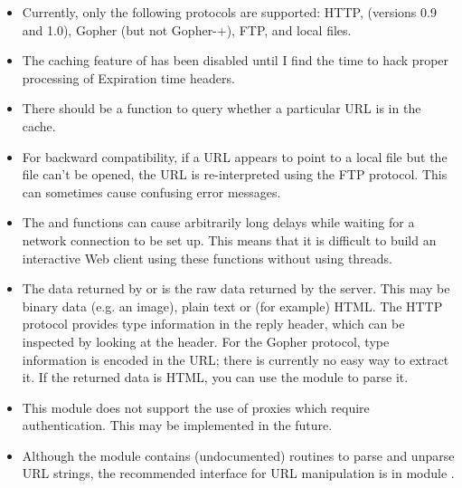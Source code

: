 \begin{itemize}

\item
Currently, only the following protocols are supported: HTTP, (versions
0.9 and 1.0), Gopher (but not Gopher-+), FTP, and local files.

\item
The caching feature of  has been disabled
until I find the time to hack proper processing of Expiration time
headers.

\item
There should be a function to query whether a particular URL is in
the cache.

\item
For backward compatibility, if a URL appears to point to a local file
but the file can't be opened, the URL is re-interpreted using the FTP
protocol.  This can sometimes cause confusing error messages.

\item
The  and  functions can
cause arbitrarily long delays while waiting for a network connection
to be set up.  This means that it is difficult to build an interactive
Web client using these functions without using threads.

\item
The data returned by  or 
is the raw data returned by the server.  This may be binary data
(e.g. an image), plain text or (for example) HTML.  The
HTTP protocol provides type information in the
reply header, which can be inspected by looking at the
 header.  For the
Gopher protocol, type information is encoded
in the URL; there is currently no easy way to extract it.  If the
returned data is HTML, you can use the module
 to parse it.

\item
This module does not support the use of proxies which require
authentication.  This may be implemented in the future.

\item
Although the  module contains (undocumented) routines
to parse and unparse URL strings, the recommended interface for URL
manipulation is in module .

\end{itemize}


